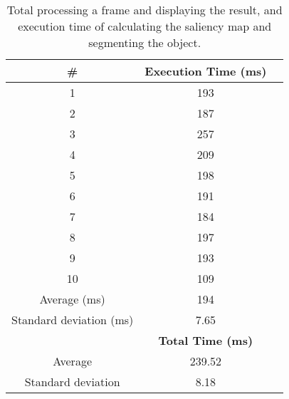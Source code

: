 \begin{table}[h]
	\footnotesize
    \begin{center}
    \begin{tabular}{c c c}
    \hline 
    \textbf{\#} & \textbf{Execution Time (ms)}\\ \hline
1&	193\\
2&	187\\
3&	257\\
4&	209\\
5&	198\\
6&	191\\
7&	184\\
8&	197\\
9&	193\\
10&	109\\
	\hline
	Average (ms) &	194 \\
	Standard deviation (ms) & 7.65\\
	\hline
	& \textbf{Total Time (ms)}\\
    \hline
    Average	& 239.52\\
    Standard deviation & 8.18\\
    \end{tabular}
	\end{center}
    \caption{Total processing a frame and displaying the result, and execution time of calculating the saliency map and segmenting the object.}
\end{table}

